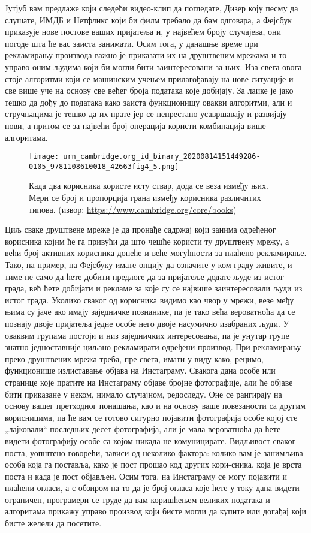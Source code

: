 \documentclass[a4paper]{article}
\begin{document}
Јутјуб вам предлаже који следећи видео-клип да погледате, Дизер коју песму да слушате, ИМДБ и Нетфликс који би филм требало да бам одговара, а Фејсбук приказује нове постове ваших пријатеља и, у највећем броју случајева, они погоде шта ће вас заиста занимати. Осим тога, у данашње време при рекламирању производа важно је приказати их на друштвеним мрежама и то управо оним људима који би могли бити заинтересовани за њих. Иза свега овога стоје алгоритми који се машинским учењем прилагођавају на нове ситуације и све више уче на основу све већег броја података које добијају. За лаике је јако тешко да дођу до података како заиста функционишу овакви алгоритми, али и стручњацима је тешко да их прате јер се непрестано усавршавају и развијају нови, а притом се за највећи број операција користи комбинација више алгоритама.

\begin{figure}[hbt!]
\centering
\texttt{[image: urn\_cambridge.org\_id\_binary\_20200814151449286-0105\_9781108610018\_42663fig4\_5.png]}
\caption{Када два корисника користе исту ствар, дода се веза између њих. Мери се број и пропорција грана између корисника различитих типова. (извор: \url{https://www.cambridge.org/core/books})}
\end{figure}

Циљ сваке друштвене мреже је да пронађе садржај који занима одређеног корисника којим ће га привући да што чешће користи ту друштвену мрежу, а већи број активних корисника донеће и веће могућности за плаћено рекламирање. Тако, на пример, на Фејсбуку имате опцију да означите у ком граду живите, и тиме не само да ћете добити предлоге да за пријатеље додате људе из истог града, већ ћете добијати и рекламе за које су се највише заинтересовали људи из истог града. Уколико сваког од корисника видимо као чвор у мрежи, везе међу њима су јаче ако имају заједничке познанике, па је тако већа вероватноћа да се познају двоје пријатеља једне особе него двоје насумично изабраних људи. У оваквим групама постоји и низ заједничких интересовања, па је унутар групе знатно једноставније циљано рекламирати одређени производ. При рекламирању преко друштвених мрежа треба, пре свега, имати у виду како, рецимо, функционише излиставање објава на Инстаграму. Свакога дана особе или странице које пратите на Инстаграму објаве бројне фотографије, али ће објаве бити приказане у неком, нимало случајном, редоследу. Оне се рангирају на основу вашег претходног понашања, као и на основу ваше повезаности са другим корисницима, па ће вам се готово сигурно појавити фотографија особе којој сте „лајковали“ последњих десет фотографија, али је мала вероватноћа да ћете видети фотографију особе са којом никада не комуницирате. Видљивост сваког поста, уопштено говорећи, зависи од неколико фактора: колико вам је занимљива особа која га поставља, како је пост прошао код других кори-сника, која је врста поста и када је пост објављен. Осим тога, на Инстаграму се могу појавити и плаћени огласи, а с обзиром на то да је број огласа које ћете у току дана видети ограничен, програмери се труде да вам коришћењем великих података и алгоритама прикажу управо производ који бисте могли да купите или догађај који бисте желели да посетите.
\end{document}
